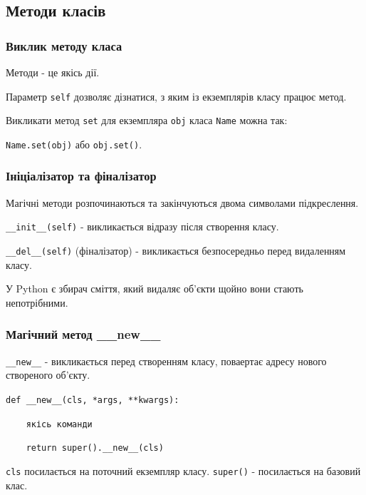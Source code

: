\subsection{Методи класів} 
\begin{frame}
\frametitle{Виклик методу класа}

Методи - це якісь дії.

Параметр \texttt{self} дозволяє дізнатися, з яким із екземплярів класу працює метод.

Викликати метод \texttt{set} для екземпляра \texttt{obj} класа \texttt{Name} можна так:

 \begin{center}
 \texttt{Name.set(obj)} або \texttt{obj.set()}.
 \end{center} 

\end{frame}

\begin{frame}
\frametitle{Ініціалізатор та фіналізатор}

Магічні методи розпочинаються та закінчуються двома символами підкреслення.

\texttt{\_\_init\_\_(self)} - викликається відразу після створення класу.

\texttt{\_\_del\_\_(self)} (фіналізатор) - викликається безпосередньо перед видаленням класу. 

У Python є збирач сміття, який видаляє об'єкти щойно вони стають непотрібними.

\end{frame}

\begin{frame}
\frametitle{Магічний метод \_\_new\_\_}

\texttt{\_\_new\_\_} - викликається перед створенням класу, поваертає адресу нового створеного об'єкту. 

\vspace{0.5cm}

\texttt{def \_\_new\_\_(cls, *args, **kwargs):} 

\texttt{~~~~якісь команди} 

\texttt{~~~~return super().\_\_new\_\_(cls)} 

\vspace{0.5cm}

\texttt{cls} посилається на поточний екземпляр класу. \texttt{super()} - посилається на базовий клас.

\end{frame}

